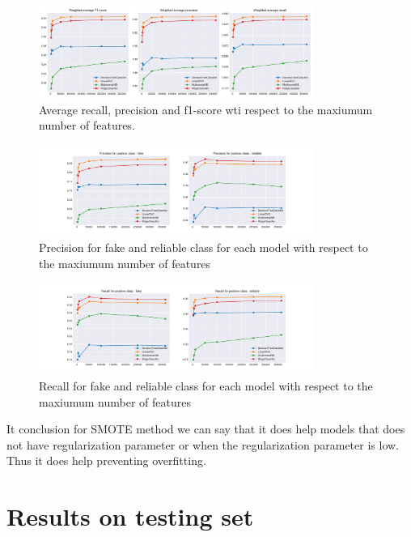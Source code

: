\begin{figure}
	\centering
	\includegraphics[width=0.8\textwidth]{images/chapitre3/ML_SMOTE_fake_average}
	\caption{Average recall, precision and f1-score wti respect to the maxiumum number of features.}
	\label{fig:chap3:smote_max_feat1}
\end{figure}
\begin{figure}
	\centering
	\includegraphics[width=0.8\textwidth]{images/chapitre3/ML_SMOTE_fake_precision}
	\caption{Precision for fake and reliable class for each model with respect to the maxiumum number of features}
	\label{fig:chap3:smote_max_feat2}
\end{figure}
\begin{figure}
	\centering
	\includegraphics[width=0.8\textwidth]{images/chapitre3/ML_SMOTE_fake_recall}
	\caption{Recall for fake and reliable class for each model with respect to the maxiumum number of features}
	\label{fig:chap3:smote_max_feat3}
\end{figure}

It conclusion for SMOTE method we can say that it does help models that does not have regularization parameter or when the regularization parameter is low. Thus it does help preventing overfitting.

\section{Results on testing set}
